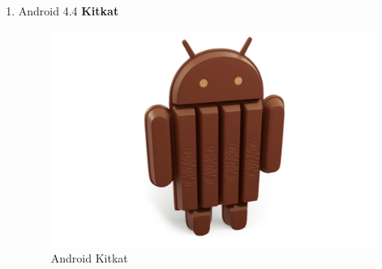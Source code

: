 \begin{enumerate}
\item Android 4.4 \textbf{Kitkat}\\
\begin{figure}[!htbp]
    \centering
    \includegraphics[scale=0.3]{pictures/android-kitkat.jpg}
    \caption{Android Kitkat}
    \label{}
\end{figure}


\end{enumerate}

